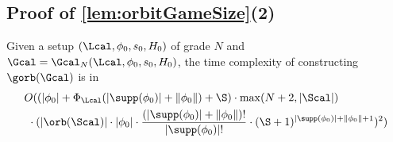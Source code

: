 \subsection*{Proof of \cref{lem:orbitGameSize}(2)}\label{app:complexityboundedgame}
\begin{lemma}
  Given a setup $(\Lcal,\phi_0,s_0,H_0)$ of grade $N$ and $\Gcal=\Gcal_N(\Lcal, \phi_0, s_0, H_0)$,
 the time complexity of constructing $\gorb(\Gcal)$ is in
 	\begin{align*}
	&O(
 	(|\phi_0| + \Phi_\Lcal(|\supp(\phi_0)| + \|\phi_0\|) + \S)
 	\cdot
 	\max(N + 2, |\Scal|
 	) \\&\ \cdot 
 	(|\orb(\Scal)| \cdot|\phi_0|\cdot \frac{(|\supp(\phi_0)|+\|\phi_0\|)!}{|\supp(\phi_0)|!}\cdot (\S + 1)^{|\supp(\phi_0)| + \|\phi_0\| + 1})
 	^2)
 \end{align*}
  \end{lemma}
